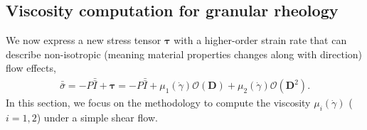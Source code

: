 


\subsection{Viscosity computation for granular rheology}
We now express a new stress tensor $\bm \tau$ with a higher-order strain rate that can describe non-isotropic (meaning material properties changes along with direction) flow effects,
\begin{align}
  \bar{\bar{\sigma}}
    = -P \bar{\bar{I}}  + \bm{\tau}
    =  -P \bar{\bar{I}}  
    + \mu_1(\dot{\gamma}) \mathcal{O}({\bm D})
    + \mu_2(\dot{\gamma}) \mathcal{O}({\bm D^2}).
  \end{align}
In this section, we focus on the methodology to compute the viscosity $\mu_i ({\dot{\gamma}})$ ($i = 1,2$) under a simple shear flow. 

